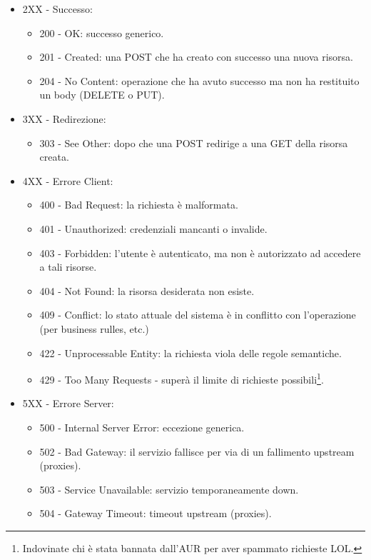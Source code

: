 \begin{itemize}
	\item 2XX - Successo:
	      \begin{itemize}
		      \item 200 - OK: successo generico.
		      \item 201 - Created: una POST che ha creato con successo una nuova risorsa.
		      \item 204 - No Content: operazione che ha avuto successo ma non ha restituito un body (DELETE o PUT).
	      \end{itemize}
	\item 3XX - Redirezione:
	      \begin{itemize}
		      \item 303 - See Other: dopo che una POST redirige a una GET della risorsa creata.
	      \end{itemize}
	\item 4XX - Errore Client:
	      \begin{itemize}
		      \item 400 - Bad Request: la richiesta è malformata.
		      \item 401 - Unauthorized: credenziali mancanti o invalide.
		      \item 403 - Forbidden: l'utente è autenticato, ma non è autorizzato ad accedere a tali risorse.
		      \item 404 - Not Found: la risorsa desiderata non esiste.
		      \item 409 - Conflict: lo stato attuale del sistema è in conflitto con l'operazione (per business rulles, etc.)
		      \item 422 - Unprocessable Entity: la richiesta viola delle regole semantiche.
		      \item 429 - Too Many Requests - superà il limite di richieste possibili\footnote{Indovinate chi è stata bannata dall'AUR per aver spammato richieste LOL.}.
	      \end{itemize}
	\item 5XX - Errore Server:
	      \begin{itemize}
		      \item 500 - Internal Server Error: eccezione generica.
		      \item 502 - Bad Gateway: il servizio fallisce per via di un fallimento upstream (proxies).
		      \item 503 - Service Unavailable: servizio temporaneamente down.
		      \item 504 - Gateway Timeout: timeout upstream (proxies).
	      \end{itemize}
\end{itemize}

